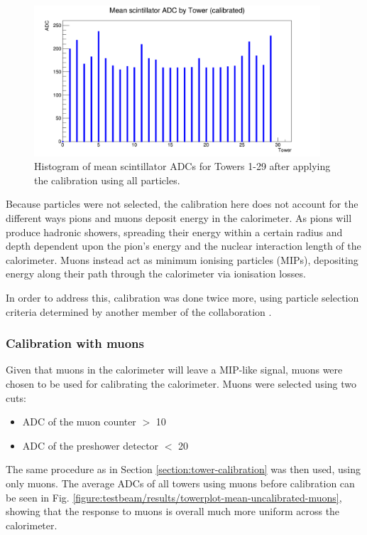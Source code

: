 \begin{figure}[hp]
	\centering
	\includegraphics[width=0.95\textwidth]{../Pictures/IDEA/Calibration/new-towerplot-all-cal.png}
	\caption{Histogram of mean scintillator \acrshort{ADC}s for Towers 1-29 after applying the calibration using all particles.}
	\label{figure:testbeam/results/towerplot-mean-calibrated-all}
\end{figure}

Because particles were not selected, the calibration here does not account for the different ways pions and muons deposit energy in the calorimeter. As pions will produce hadronic showers, spreading their energy within a certain radius and depth dependent upon the pion's energy and the nuclear interaction length of the calorimeter. Muons instead act as minimum ionising particles (\acrshort{MIP}s), depositing energy along their path through the calorimeter via ionisation losses.

In order to address this, calibration was done twice more, using particle selection criteria determined by another member of the collaboration \cite{idea-particle-selection}.

\subsubsection{Calibration with muons}
Given that muons in the calorimeter will leave a \acrshort{MIP}-like signal, muons were chosen to be used for calibrating the calorimeter. Muons were selected using two cuts: 

\begin{itemize}
	\item ADC of the muon counter $>$ 10
	\item ADC of the preshower detector $<$ 20
\end{itemize}

The same procedure as in Section \ref{section:tower-calibration} was then used, using only muons. The average ADCs of all towers using muons before calibration can be seen in Fig. \ref{figure:testbeam/results/towerplot-mean-uncalibrated-muons}, showing that the response to muons is overall much more uniform across the calorimeter.

